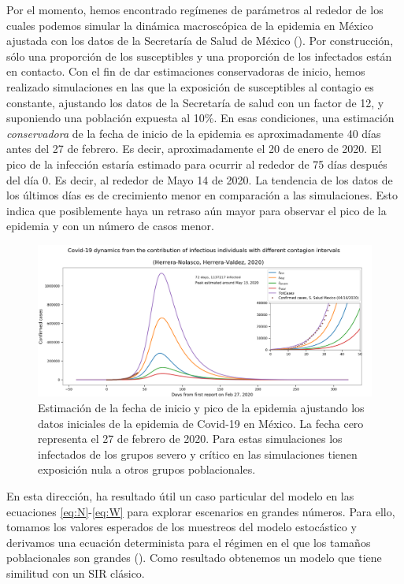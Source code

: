 \documentclass[8pt]{article}
\begin{document}
 Por el momento, hemos encontrado regímenes de parámetros al rededor de los cuales podemos simular la dinámica macroscópica de la epidemia en México ajustada con los datos de la Secretaría de Salud de México (). Por construcción, sólo una proporción de los susceptibles y una proporción de los infectados están en contacto. Con el fin de dar estimaciones conservadoras de inicio, hemos realizado simulaciones en las que la exposición de susceptibles al contagio es constante, ajustando los datos de la Secretaría de salud  con un factor de 12, y  suponiendo una  población expuesta al 10\%. En esas condiciones, una estimación \textit{conservadora} de la fecha de inicio de la epidemia es aproximadamente 40 días antes del 27 de febrero. Es decir, aproximadamente el 20 de enero de 2020. El pico de la infección estaría estimado para ocurrir al rededor de 75 días después del día 0. Es decir, al rededor de Mayo 14 de 2020. La tendencia de los datos de los últimos días es de crecimiento menor en comparación a las simulaciones. Esto indica que posiblemente haya un retraso aún mayor para observar el pico de la epidemia y con un número de casos menor.
 
 
\begin{figure}[h]
\includegraphics[width=\textwidth]{../figures_COVID19_models/dam_COVID19_Mexico_InitialFit_Herrera-Valdez+Herrera-Nolasco_2020}
\caption{Estimación de la fecha de inicio y pico de la epidemia ajustando los datos iniciales de la epidemia de Covid-19 en México. La fecha cero representa el 27 de febrero de 2020. Para estas simulaciones los infectados de los grupos severo y crítico en las simulaciones tienen exposición nula a otros grupos poblacionales. } \label{fig:inicioPicoNIW}
\end{figure}


 

En esta dirección, ha resultado útil un caso particular del modelo en las ecuaciones \eqref{eq:N}-\eqref{eq:W}  para explorar escenarios en grandes números.
 Para ello, tomamos los valores esperados de los muestreos del modelo estocástico y derivamos una ecuación determinista para el régimen en el que los tamaños poblacionales son grandes (). Como resultado obtenemos un modelo que tiene similitud con un SIR clásico.
\end{document}
